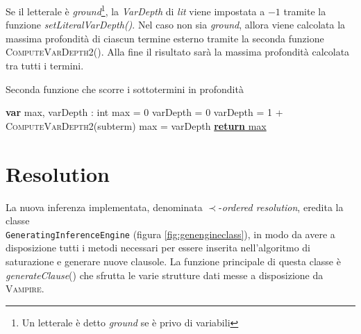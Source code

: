 Se il letterale è \emph{ground}\footnote{Un letterale è detto \emph{ground} se è privo di variabili}, la \emph{VarDepth} di \emph{lit} viene impostata a $-1$ tramite la funzione 
\emph{setLiteralVarDepth()}.
Nel caso non sia \emph{ground}, allora viene calcolata la massima profondità di ciascun termine esterno tramite la seconda funzione \textsc{ComputeVarDepth2}().
Alla fine il risultato sarà la massima profondità calcolata tra tutti i termini. 
\begin{algorithm}[H]
    \caption{Seconda funzione che scorre i sottotermini in profondità}
    \begin{algorithmic}
        \State \textbf{var} max, varDepth : int
        \State max = 0
         
            \State varDepth = 0
            \State varDepth = 1 + \textsc{ComputeVarDepth2}(subterm) 
                \State max = varDepth
            \EndIf
        \EndFor
        \State \underline{\textbf{return} max}
        \EndFunction
    \end{algorithmic}
\end{algorithm}
\section{Resolution}
La nuova inferenza implementata, denominata $\prec$-\emph{ordered resolution}, eredita la classe \\\verb|GeneratingInferenceEngine| (figura \ref{fig:genengineclass}), 
 in modo da avere a disposizione tutti i metodi necessari per essere inserita 
nell'algoritmo di saturazione e generare nuove clausole.
La funzione principale di questa classe è \emph{generateClause}() che sfrutta le varie strutture 
dati messe a disposizione da \textsc{Vampire}. 

